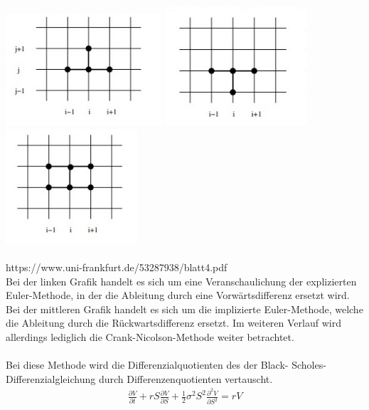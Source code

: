 \documentclass[12pt,titlepage]{article}
\begin{document}
\includegraphics[width=5.8cm]{ex.png}  \includegraphics[width=5.3cm]{im.png} \includegraphics[width=4.9cm]{cn.png} \\\\
https://www.uni-frankfurt.de/53287938/blatt4.pdf\\
Bei der linken Grafik handelt es sich um eine Veranschaulichung der explizierten Euler-Methode, in der die Ableitung durch eine Vorwärtsdifferenz ersetzt wird. Bei der mittleren Grafik handelt es sich um die implizierte Euler-Methode, welche die Ableitung durch die Rückwartsdifferenz ersetzt. Im weiteren Verlauf wird allerdings lediglich die Crank-Nicolson-Methode weiter betrachtet.\\\\
Bei diese Methode wird die Differenzialquotienten des der Black- Scholes-\\Differenzialgleichung durch Differenzenquotienten vertauscht.  \\
\begin{align*}
\frac{\partial V}{\partial t}+rS \frac{\partial V}{\partial S}+ \frac{1}{2} \sigma ^2 S^2 \frac{\partial ^2 V}{\partial S^2}=rV
\end{align*}\\
\end{document}
